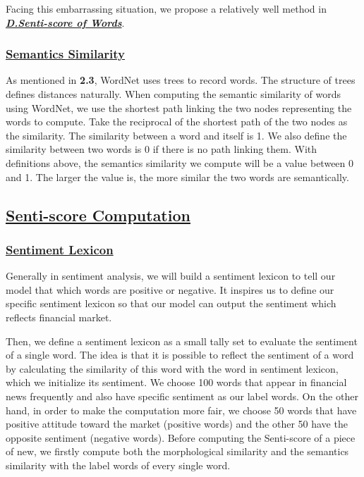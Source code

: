 \documentclass[10pt, conference, compsocconf]{IEEEtran}
\begin{document}
Facing this embarrassing situation, we propose a relatively well method in \textbf{\underline{\textit{D.Senti-score of Words}}}.

\subsubsection{\underline{Semantics Similarity}}

As mentioned in \textbf{2.3}, WordNet uses trees to record words. The structure of trees defines distances naturally. When computing the semantic similarity of words using WordNet, we use the shortest path linking the two nodes representing the words to compute. Take the reciprocal of the shortest path of the two nodes as the similarity. The similarity between a word and itself is 1. We also define the similarity between two words is 0 if there is no path linking them. With definitions above, the semantics similarity we compute will be a value between 0 and 1. The larger the value is, the more similar the two words are semantically.

\subsection{\underline{Senti-score Computation}}
\subsubsection{\underline{Sentiment Lexicon}}

Generally in sentiment analysis, we will build a sentiment lexicon to tell our model that which words are positive or negative. It inspires us to define our specific sentiment lexicon so that our model can output the sentiment which reflects financial market.

Then, we define a sentiment lexicon as a small tally set to evaluate the sentiment of a single word. The idea is that it is possible to reflect the sentiment of a word by calculating the similarity of this word with the word in sentiment lexicon, which we initialize its sentiment. We choose 100 words that appear in financial news frequently and also have specific sentiment as our label words. On the other hand, in order to make the computation more fair, we choose 50 words that have positive attitude toward the market (positive words) and the other 50 have the opposite sentiment (negative words). Before computing the Senti-score of a piece of new, we firstly compute both the morphological similarity and the semantics similarity with the label words of every single word.
\end{document}
